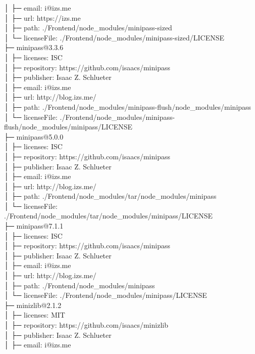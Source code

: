 │  ├─ email: i@izs.me\\
│  ├─ url: https://izs.me\\
│  ├─ path: ./Frontend/node\_modules/minipass-sized\\
│  └─ licenseFile: ./Frontend/node\_modules/minipass-sized/LICENSE\\
├─ minipass@3.3.6\\
│  ├─ licenses: ISC\\
│  ├─ repository: https://github.com/isaacs/minipass\\
│  ├─ publisher: Isaac Z. Schlueter\\
│  ├─ email: i@izs.me\\
│  ├─ url: http://blog.izs.me/\\
│  ├─ path: ./Frontend/node\_modules/minipass-flush/node\_modules/minipass\\
│  └─ licenseFile: ./Frontend/node\_modules/minipass-flush/node\_modules/minipass/LICENSE\\
├─ minipass@5.0.0\\
│  ├─ licenses: ISC\\
│  ├─ repository: https://github.com/isaacs/minipass\\
│  ├─ publisher: Isaac Z. Schlueter\\
│  ├─ email: i@izs.me\\
│  ├─ url: http://blog.izs.me/\\
│  ├─ path: ./Frontend/node\_modules/tar/node\_modules/minipass\\
│  └─ licenseFile: ./Frontend/node\_modules/tar/node\_modules/minipass/LICENSE\\
├─ minipass@7.1.1\\
│  ├─ licenses: ISC\\
│  ├─ repository: https://github.com/isaacs/minipass\\
│  ├─ publisher: Isaac Z. Schlueter\\
│  ├─ email: i@izs.me\\
│  ├─ url: http://blog.izs.me/\\
│  ├─ path: ./Frontend/node\_modules/minipass\\
│  └─ licenseFile: ./Frontend/node\_modules/minipass/LICENSE\\
├─ minizlib@2.1.2\\
│  ├─ licenses: MIT\\
│  ├─ repository: https://github.com/isaacs/minizlib\\
│  ├─ publisher: Isaac Z. Schlueter\\
│  ├─ email: i@izs.me\\
